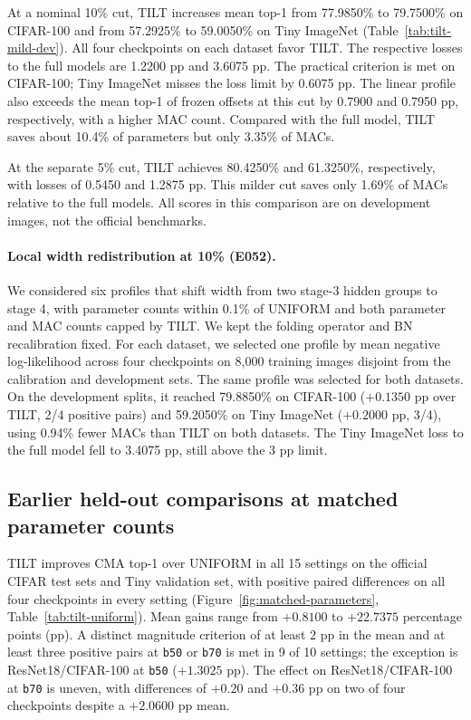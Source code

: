 \documentclass[11pt,a4paper]{article}
\newcommand{\Uniform}{UNIFORM}
\newcommand{\Tilt}{TILT}
\newcommand{\bfifty}{\texttt{b50}}
\newcommand{\bseventy}{\texttt{b70}}
\begin{document}
At a nominal 10\% cut, \Tilt{} increases mean top-1 from 77.9850\% to
79.7500\% on CIFAR-100 and from 57.2925\% to 59.0050\% on Tiny ImageNet
(Table~\ref{tab:tilt-mild-dev}). All four checkpoints on each dataset
favor \Tilt{}. The respective losses to the full models are 1.2200 pp
and 3.6075 pp. The practical criterion is met on CIFAR-100; Tiny ImageNet
misses the loss limit by 0.6075 pp. The linear profile also exceeds the
mean top-1 of frozen offsets at this cut by 0.7900 and 0.7950 pp,
respectively, with a higher MAC count. Compared with the full model,
\Tilt{} saves about 10.4\% of parameters but only 3.35\% of MACs.

At the separate 5\% cut, \Tilt{} achieves 80.4250\% and 61.3250\%,
respectively, with losses of 0.5450 and 1.2875 pp. This milder cut saves
only 1.69\% of MACs relative to the full models. All scores in this
comparison are on development images, not the official benchmarks.

\FloatBarrier

\paragraph{Local width redistribution at 10\% (E052).}
We considered six profiles that shift width from two stage-3 hidden groups
to stage 4, with parameter counts within 0.1\% of \Uniform{} and both
parameter and MAC counts capped by \Tilt{}. We kept the folding operator
and BN recalibration fixed. For each dataset, we selected one profile by
mean negative log-likelihood across four checkpoints on 8,000 training
images disjoint from the calibration and development sets. The same
profile was selected for both datasets. On the development splits, it
reached 79.8850\% on CIFAR-100 ($+0.1350$ pp over \Tilt{}, 2/4 positive
pairs) and 59.2050\% on Tiny ImageNet ($+0.2000$ pp, 3/4), using 0.94\%
fewer MACs than \Tilt{} on both datasets. The Tiny ImageNet loss to the
full model fell to 3.4075 pp, still above the 3 pp limit.

\subsection{Earlier held-out comparisons at matched parameter counts}

\Tilt{} improves CMA top-1 over \Uniform{} in all 15 settings
on the official CIFAR test sets and Tiny validation set, with positive
paired differences on all four checkpoints in every setting
(Figure~\ref{fig:matched-parameters}, Table~\ref{tab:tilt-uniform}). Mean
gains range from $+0.8100$ to $+22.7375$ percentage points (pp). A distinct magnitude
criterion of at least $2$ pp in the mean and at least three positive
pairs at \bfifty{} or \bseventy{} is met in 9 of 10 settings; the exception
is ResNet18/CIFAR-100 at \bfifty{} ($+1.3025$ pp). The effect on
ResNet18/CIFAR-100 at \bseventy{} is uneven, with differences of $+0.20$
and $+0.36$ pp on two of four checkpoints despite a $+2.0600$ pp mean.
\end{document}

